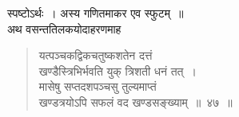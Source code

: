 \documentclass[11pt, openany]{book}
\begin{document}
स्पष्टोऽर्थः~। अस्य गणितमाकर एव स्फुटम्~॥~\\

\vspace{-3mm}
अथ वसन्ततिलकयोदाहरणमाह\textendash
\begin{quote}
    \ex
    यत्पञ्चकद्विकचतुष्कशतेन दत्तं \\

\vspace{-7mm}
\hspace{1cm} खण्डैस्त्रिभिर्भवति युक् त्रिशती धनं तत्~। \\

\vspace{-7mm}
 मासेषु सप्तदशपञ्चसु तुल्यमाप्तं \\

\vspace{-7mm}
\hspace{1cm} खण्डत्रयोऽपि सफलं वद खण्डसङ्ख्याम्~॥~४७~॥~
\end{quote}
 
\end{document}
